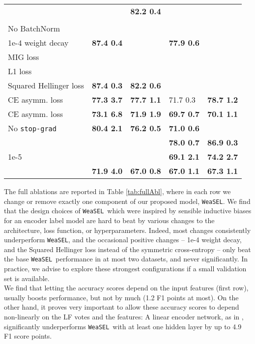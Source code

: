 \documentclass{article}
\newcommand{\weasel}{\texttt{WeaSEL}}\newcommand{\brackets}[1]{\left( #1 \right)}
\newcommand{\Abl}[2]{{#1  #2}}
\newcommand{\emphAbl}[2]{{\textbf{#1  #2}}}
\newcommand{\emphBadAbl}[2]{{\color{red}\textbf{#1  #2}}}
\begin{document}
\begin{table}
\begin{tabular}{@{} *5l @{}}
       & 
         & \emphAbl{82.2}{0.4} &  & \\
       & 
         &  &  &  \\
    No BatchNorm &
         &  &  &  \\
    1e-4 weight decay &
        \emphAbl{87.4}{0.4} &  & \emphAbl{77.9}{0.6} & \\
    MIG loss &
         &  &  & \\
    L1 loss &
         &  &  & \\
    Squared Hellinger loss &
        \emphAbl{87.4}{0.3} & \emphAbl{82.2}{0.6} &  &  \\
    CE asymm. loss &
            \emphBadAbl{77.3}{3.7} & \emphBadAbl{77.7}{1.1} &  \Abl{71.7}{0.3} & \emphBadAbl{78.7}{1.2}\\
    CE asymm. loss &
            \emphBadAbl{73.1}{6.8} & \emphBadAbl{71.9}{1.9} & \emphBadAbl{69.7}{0.7} & \emphBadAbl{70.1}{1.1}\\
    No \texttt{stop-grad} &
      \emphBadAbl{80.4}{2.1} & \emphBadAbl{76.2}{0.5}  & \emphBadAbl{71.0}{0.6} & \\
     &
         &  & \emphAbl{78.0}{0.7} & \emphAbl{86.9}{0.3}\\
     1e-5 &
         &  & \emphBadAbl{69.1}{2.1} & \emphBadAbl{74.2}{2.7}\\
     &
        \emphBadAbl{71.9}{4.0} &  \emphBadAbl{67.0}{0.8} & \emphBadAbl{67.0}{1.1} &  \emphBadAbl{67.3}{1.1} \\
\bottomrule
\end{tabular}
\end{table}
 The full ablations are reported in Table \ref{tab:fullAbl}, where in each row we change or remove exactly one component of our proposed model, \weasel.
We find that the design choices of \weasel\ which were inspired by sensible inductive biases for an encoder label model are hard to beat by various changes to the architecture, loss function, or hyperparameters.
Indeed, most changes consistently underperform \weasel, and the occasional positive changes -- 1e-4 weight decay, and the Squared Hellinger loss instead of the symmetric cross-entropy -- only beat the base \weasel\ performance in at most two datasets, and never significantly. In practice, we advise to explore these strongest configurations if a small validation set is available.
\\
We find that letting the accuracy scores depend on the input features (first row), usually boosts performance, but not by much (1.2 F1 points at most).
On the other hand, it proves very important to allow these accuracy scores to depend non-linearly on the LF votes and the features: A linear encoder network, as in \cite{MaxMIG}, significantly underperforms \weasel\ with at least one hidden layer by up to 4.9 F1 score points.
\end{document}
